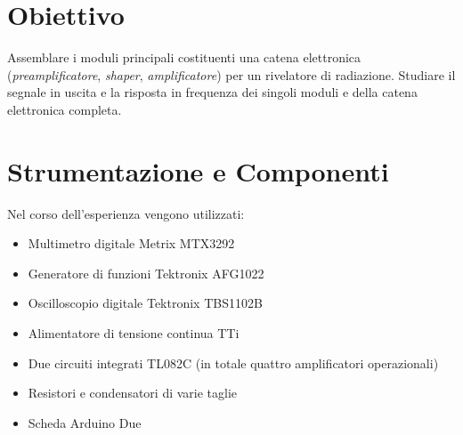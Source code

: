 \documentclass[a4paper,11pt]{article} %
\begin{document}

\section{Obiettivo}

Assemblare i moduli principali costituenti una catena elettronica (\textit{preamplificatore}, \textit{shaper},
\textit{amplificatore}) per un rivelatore di radiazione. Studiare il segnale in uscita e la risposta in frequenza dei
singoli moduli e della catena elettronica completa.


\section{Strumentazione e Componenti}\label{s:strumenti}

Nel corso dell'esperienza vengono utilizzati:
\begin{itemize}[itemsep=-0.5ex]
	\item Multimetro digitale Metrix MTX3292
	\item Generatore di funzioni Tektronix AFG1022
	\item Oscilloscopio digitale Tektronix TBS1102B
	\item Alimentatore di tensione continua TTi
	\item Due circuiti integrati TL082C (in totale quattro amplificatori operazionali)
	\item Resistori e condensatori di varie taglie
	\item Scheda Arduino Due
\end{itemize}

\end{document}
